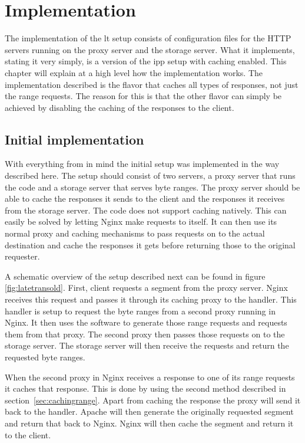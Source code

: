 \documentclass[twoside,openright]{uva-bachelor-thesis}
\begin{document}
\chapter{Implementation}
The implementation of the \gls{lt} setup consists of configuration files for the
HTTP servers running on the proxy server and the storage server. What it
implements, stating it very simply, is a version of the \gls{ipp} setup with
caching enabled. This chapter will explain at a high level how the
implementation works. The implementation described is the flavor that caches all
types of responses, not just the range requests. The reason for this is that the
other flavor can simply be achieved by disabling the caching of the responses to
the client.


\section{Initial implementation}
With everything from  in mind the initial \lt setup was
implemented in the way described here. The setup should consist of two servers,
a proxy server that runs the \usp code and a storage server that serves byte
ranges. The proxy server should be able to cache the responses it sends to the
client and the responses it receives from the storage server. The \usp code does
not support caching natively. This can easily be solved by letting Nginx make
requests to itself. It can then use its normal proxy and caching mechanisms to
pass requests on to the actual destination and cache the responses it gets
before returning those to the original requester.

A schematic overview of the setup described next can be found in figure
\vref{fig:latetransold}. First, client requests a segment from the proxy server.
Nginx receives this request and passes it through its caching proxy to the
\ipplong handler. This handler is setup to request the byte ranges from a second
proxy running in Nginx. It then uses the \usp software to generate those range
requests and requests them from that proxy. The second proxy then passes those
requests on to the storage server. The storage server will then receive the
requests and return the requested byte ranges.

When the second proxy in Nginx receives a response to one of its range requests
it caches that response. This is done by using the second method described in
section~\vref{sec:cachingrange}. Apart from caching the response the proxy will
send it back to the \ipplong handler. Apache will then generate the originally requested
segment and return that back to Nginx.  Nginx will then cache the segment and
return it to the client.
\end{document}
